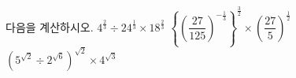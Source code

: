 다음을 계산하시오.
 $4^{\frac{2}{3}}\div 24^{\frac{1}{3}}\times 18^{\frac{2}{3}}$
 $\left\{\left(\dfrac{27}{125}\right)^{-\frac{1}{3}}\right\}^{\frac{3}{2}}\times\left(\dfrac{27}{5}\right)^{\frac{1}{2}}$
 $(5^{\sqrt{2}}\div 2^{\sqrt{6}})^{\sqrt{2}}\times 4^{\sqrt{3}}$
